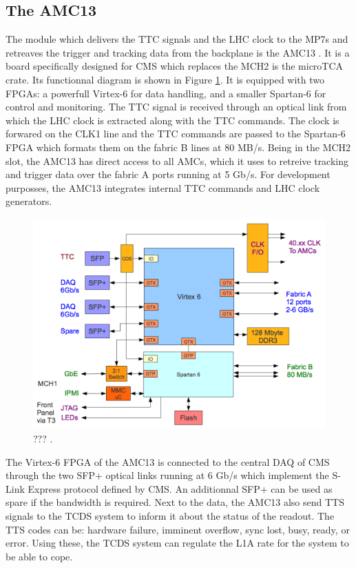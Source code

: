     \subsection{The AMC13}

      The module which delivers the TTC signals and the LHC clock to the MP7s and retreaves the trigger and tracking data from the backplane is the AMC13 \cite{AMC13}. It is a board specifically designed for CMS which replaces the MCH2 is the microTCA crate. Its functionnal diagram is shown in Figure \ref{fig:II-2-daq-amc13}. It is equipped with two FPGAs: a powerfull Virtex-6 for data handling, and a smaller Spartan-6 for control and monitoring. The TTC signal is received through an optical link from which the LHC clock is extracted along with the TTC commands. The clock is forwared on the CLK1 line and the TTC commands are passed to the Spartan-6 FPGA which formats them on the fabric B lines at 80 MB/s. Being in the MCH2 slot, the AMC13 has direct access to all AMCs, which it uses to retreive tracking and trigger data over the fabric A ports running at 5 Gb/s. For development purposses, the AMC13 integrates internal TTC commands and LHC clock generators. \\

      \begin{figure}[h!]
        \centering
        \includegraphics[width=\textwidth]{img/II-2-daq/amc13.png}
        \caption{??? \cite{AMC13}.}
        \label{fig:II-2-daq-amc13}
      \end{figure}

      The Virtex-6 FPGA of the AMC13 is connected to the central DAQ of CMS through the two SFP+ optical links running at 6 Gb/s which implement the S-Link Express protocol defined by CMS. An additionnal SFP+ can be used as spare if the bandwidth is required. Next to the data, the AMC13 also send TTS signals to the TCDS system to inform it about the status of the readout. The TTS codes can be: hardware failure, imminent overflow, sync lost, busy, ready, or error. Using these, the TCDS system can regulate the L1A rate for the system to be able to cope.

